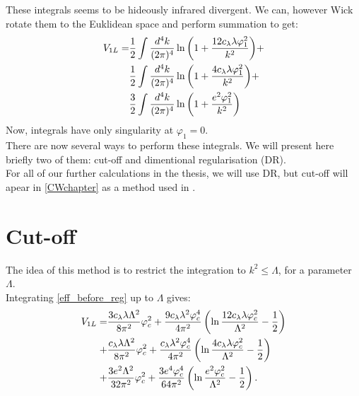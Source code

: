 These integrals seems to be hideously infrared divergent. 
We can, however Wick rotate them to the Euklidean space and perform summation to get:
\begin{align}\label{eff_before_reg}
V_{1L}=&\frac{1}{2} \int\frac{d^4k}{(2\pi)^4}\ln{\left(1+\frac{12c_\lambda\lambda\varphi_1^2}{k^2}
\right)} +\\
&\frac{1}{2} \int\frac{d^4k}{(2\pi)^4}\ln{\left(1+\frac{4c_\lambda\lambda\varphi_1^2}{k^2}
\right)} +\\ 
&\frac{3}{2} \int\frac{d^4k}{(2\pi)^4}\ln{\left(1+\frac{e^2\varphi_1^2}{k^2}\right)}
\end{align}
Now, integrals have only singularity at $\varphi_1 = 0$. \\
There are now several ways to perform these integrals. We will present here briefly two of them: 
cut-off and
dimentional regularisation (DR). \\
For all of our further calculations in the thesis, we will use DR, 
but cut-off will apear in \ref{CWchapter} 
as a method used in \cite{Coleman1973}. \\
\section{Cut-off}
The idea of this method is to restrict the integration to $k^2 \leq \Lambda$, for a 
parameter $\Lambda$. \\
Integrating \ref{eff_before_reg} up to $\Lambda$ gives:
\begin{align}
V_{1L}=
&\frac{3c_\lambda\lambda\Lambda^2}{8\pi^2}\varphi_c^2+\frac{9c_\lambda\lambda^2\varphi_c^4}{4\pi^2}
\left(\ln\frac{12c_\lambda\lambda\varphi_c^2}{\Lambda^2}-\frac{1}{2}\right)  \notag \\
+&\frac{c_\lambda\lambda\Lambda^2}{8\pi^2}\varphi_c^2+\frac{c_\lambda\lambda^2\varphi_c^4}{4\pi^2}
\left(\ln\frac{4c_\lambda\lambda\varphi_c^2}{\Lambda^2}-\frac{1}{2}\right)  \notag \\
+&\frac{3e^2\Lambda^2}{32\pi^2}\varphi_c^2+\frac{3e^4\varphi_c^4}{64\pi^2}
\left(\ln\frac{e^2\varphi_c^2}{\Lambda^2}-\frac{1}{2}\right).
\end{align}

